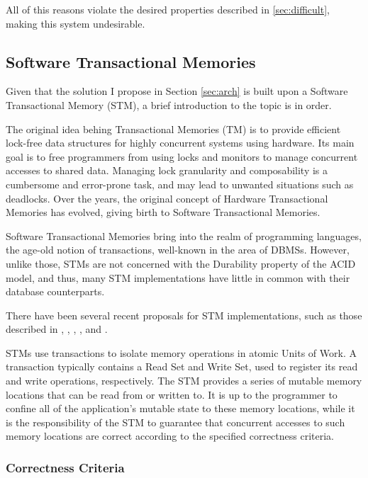 \documentclass{llncs}
\begin{document}
All of this reasons violate the desired properties described in
\ref{sec:difficult}, making this system undesirable.

\subsection{Software Transactional Memories}
\label{sec:stm}

Given that the solution I propose in Section \ref{sec:arch} is built
upon a Software Transactional Memory (STM), a brief introduction to
the topic is in order.

The original idea behing Transactional Memories (TM) is to provide
efficient lock-free data structures for highly concurrent systems
\cite{herlihy1993transactional} using hardware. Its main goal is to
free programmers from using locks and monitors to manage concurrent
accesses to shared data. Managing lock granularity and composability
is a cumbersome and error-prone task, and may lead to unwanted
situations such as deadlocks. Over the years, the original concept of
Hardware Transactional Memories has evolved, giving birth to Software
Transactional Memories. 

Software Transactional Memories bring into the realm of programming
languages, the age-old notion of transactions, well-known in the area
of DBMSs. However, unlike those, STMs are not concerned with the
Durability property of the ACID model, and thus, many STM
implementations have little in common with their database
counterparts. 

There have been several recent proposals for STM implementations, such
as those described in \cite{cachopo2006versioned},
\cite{herlihy2003software}, \cite{marathe2005adaptive},
\cite{dice2006transactional}, \cite{riegel2006lazy} and 
\cite{marathe2006lowering}.

STMs use transactions to isolate memory operations in atomic Units of
Work. A transaction typically contains a Read Set and Write Set, used
to register its read and write operations, respectively. The STM
provides a series of mutable memory locations that can be read from or
written to. It is up to the programmer to confine all of the
application's mutable state to these memory locations, while it is the
responsibility of the STM to guarantee that concurrent accesses to
such memory locations are correct according to the specified
correctness criteria.

\subsubsection{Correctness Criteria}
\end{document}
